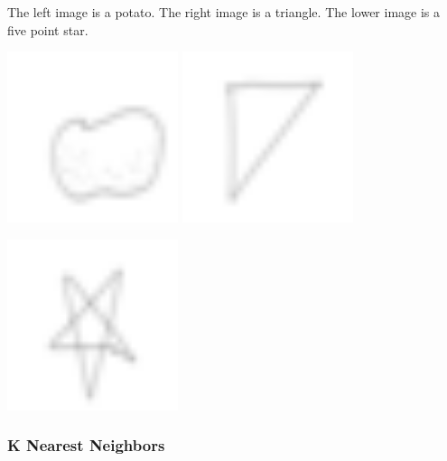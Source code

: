 \documentclass[leqno]{article}
\begin{document}
The left image is a potato. The right image is a triangle. The lower image is a
five point star.


\strut
\noindent\null\hfill
\includegraphics[width=5cm]{potato.png} \hfill
\includegraphics[width=5cm]{triangle.png} \hfill\null

\noindent\null\hfill\includegraphics[width=5cm]{star.png} \hfill

\subsubsection{K Nearest Neighbors}
\end{document}
